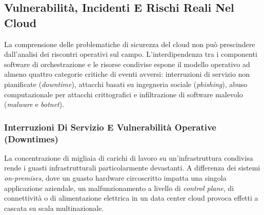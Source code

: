 \documentclass[11pt, a4paper]{article}
\begin{document}
\subsection{Vulnerabilità, Incidenti E Rischi Reali Nel Cloud}

La comprensione delle problematiche di sicurezza del cloud non può prescindere dall'analisi dei riscontri operativi sul campo. L'interdipendenza tra i componenti software di orchestrazione e le risorse condivise espone il modello operativo ad almeno quattro categorie critiche di eventi avversi: interruzioni di servizio non pianificate (\emph{downtime}), attacchi basati su ingegneria sociale (\emph{phishing}), abuso computazionale per attacchi crittografici e infiltrazione di software malevolo (\emph{malware} e \emph{botnet}).

\subsubsection{Interruzioni Di Servizio E Vulnerabilità Operative (Downtimes)}
La concentrazione di migliaia di carichi di lavoro su un'infrastruttura condivisa rende i guasti infrastrutturali particolarmente devastanti. A differenza dei sistemi \emph{on-premises}, dove un guasto hardware circoscritto impatta una singola applicazione aziendale, un malfunzionamento a livello di \emph{control plane}, di connettività o di alimentazione elettrica in un data center cloud provoca effetti a cascata su scala multinazionale.

\end{document}
